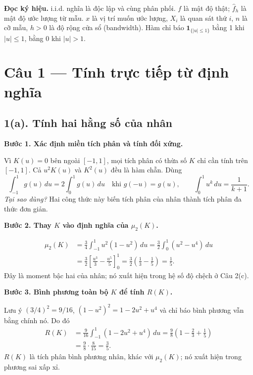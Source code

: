 \documentclass[11pt,a4paper]{article}
\newcommand{\fh}{\widehat f_h}
\newcommand{\buoc}[1]{\par\medskip\textbf{#1}\par}
\begin{document}
\textbf{Đọc ký hiệu.} i.i.d. nghĩa là độc lập và cùng phân phối. $f$ là mật độ thật; $\fh$ là mật độ ước lượng từ mẫu. $x$ là vị trí muốn ước lượng, $X_i$ là quan sát thứ $i$, $n$ là cỡ mẫu, $h>0$ là độ rộng cửa sổ (bandwidth). Hàm chỉ báo $\mathbf1_{\{|u|\leq1\}}$ bằng 1 khi $|u|\leq1$, bằng 0 khi $|u|>1$.

\clearpage
\begingroup
\setlength{\abovedisplayskip}{6pt}
\setlength{\belowdisplayskip}{6pt}
\setlength{\abovedisplayshortskip}{3pt}
\setlength{\belowdisplayshortskip}{3pt}
\renewcommand{\buoc}[1]{\par\textbf{#1}\par}
\section*{Câu 1 — Tính trực tiếp từ định nghĩa}
\subsection*{1(a). Tính hai hằng số của nhân}
\buoc{Bước 1. Xác định miền tích phân và tính đối xứng.}
Vì $K(u)=0$ bên ngoài $[-1,1]$, mọi tích phân có thừa số $K$ chỉ cần tính trên $[-1,1]$. Cả $u^2K(u)$ và $K^2(u)$ đều là hàm chẵn. Dùng
\[
\int_{-1}^1g(u)\,du=2\int_0^1g(u)\,du\quad\text{khi }g(-u)=g(u),
\qquad \int_0^1u^k\,du=\frac{1}{k+1}.
\]
\textit{Tại sao dùng?} Hai công thức này biến tích phân của nhân thành tích phân đa thức đơn giản.

\buoc{Bước 2. Thay $K$ vào định nghĩa của $\mu_2(K)$.}
\begin{align*}
\mu_2(K)&=\frac34\int_{-1}^1u^2(1-u^2)\,du
=\frac32\int_0^1(u^2-u^4)\,du\\
&=\frac32\left[\frac{u^3}{3}-\frac{u^5}{5}\right]_0^1
=\frac32\left(\frac13-\frac15\right)
=\boxed{\frac15}.
\end{align*}
Đây là moment bậc hai của nhân; nó xuất hiện trong hệ số độ chệch ở Câu 2(c).

\buoc{Bước 3. Bình phương toàn bộ $K$ để tính $R(K)$.}
Lưu ý $(3/4)^2=9/16$, $(1-u^2)^2=1-2u^2+u^4$ và chỉ báo bình phương vẫn bằng chính nó. Do đó
\begin{align*}
R(K)&=\frac9{16}\int_{-1}^1(1-2u^2+u^4)\,du
=\frac98\left(1-\frac23+\frac15\right)\\
&=\frac98\cdot\frac8{15}=\boxed{\frac35}.
\end{align*}
$R(K)$ là tích phân bình phương nhân, khác với $\mu_2(K)$; nó xuất hiện trong phương sai xấp xỉ.
\end{document}
